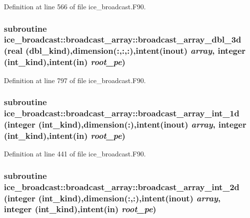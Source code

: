 Definition at line 566 of file ice\_\-broadcast.F90.\hypertarget{interfaceice__broadcast_1_1broadcast__array_a0b6d8fba0fa8297c38daf5dba3ae2647}{
\subsubsection[{broadcast\_\-array\_\-dbl\_\-3d}]{\setlength{\rightskip}{0pt plus 5cm}subroutine ice\_\-broadcast::broadcast\_\-array::broadcast\_\-array\_\-dbl\_\-3d (real (dbl\_\-kind),dimension(:,:,:),intent(inout) {\em array}, \/  integer (int\_\-kind),intent(in) {\em root\_\-pe})}}
\label{interfaceice__broadcast_1_1broadcast__array_a0b6d8fba0fa8297c38daf5dba3ae2647}


Definition at line 797 of file ice\_\-broadcast.F90.\hypertarget{interfaceice__broadcast_1_1broadcast__array_a4934318e47c1536917cf8eb758e128c2}{
\subsubsection[{broadcast\_\-array\_\-int\_\-1d}]{\setlength{\rightskip}{0pt plus 5cm}subroutine ice\_\-broadcast::broadcast\_\-array::broadcast\_\-array\_\-int\_\-1d (integer (int\_\-kind),dimension(:),intent(inout) {\em array}, \/  integer (int\_\-kind),intent(in) {\em root\_\-pe})}}
\label{interfaceice__broadcast_1_1broadcast__array_a4934318e47c1536917cf8eb758e128c2}


Definition at line 441 of file ice\_\-broadcast.F90.\hypertarget{interfaceice__broadcast_1_1broadcast__array_afa9d1329e1267aeee13ce2917d9b528c}{
\subsubsection[{broadcast\_\-array\_\-int\_\-2d}]{\setlength{\rightskip}{0pt plus 5cm}subroutine ice\_\-broadcast::broadcast\_\-array::broadcast\_\-array\_\-int\_\-2d (integer (int\_\-kind),dimension(:,:),intent(inout) {\em array}, \/  integer (int\_\-kind),intent(in) {\em root\_\-pe})}}
\label{interfaceice__broadcast_1_1broadcast__array_afa9d1329e1267aeee13ce2917d9b528c}


